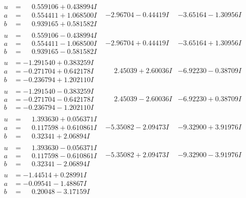 \documentclass[1p]{elsarticle_modified}
\theoremstyle{definition}
\begin{document}
$$\begin{array}{c|c|c}
\begin{aligned}
u &= \phantom{-}0.559106 + 0.438994 I \\
a &= \phantom{-}0.554411 + 1.068500 I \\
b &= \phantom{-}0.939165 + 0.581582 I\end{aligned}
 & -2.96704 - 0.44419 I & -3.65164 - 1.30956 I \\ \hline\begin{aligned}
u &= \phantom{-}0.559106 - 0.438994 I \\
a &= \phantom{-}0.554411 - 1.068500 I \\
b &= \phantom{-}0.939165 - 0.581582 I\end{aligned}
 & -2.96704 + 0.44419 I & -3.65164 + 1.30956 I \\ \hline\begin{aligned}
u &= -1.291540 + 0.383259 I \\
a &= -0.271704 + 0.642178 I \\
b &= -0.236794 + 1.202110 I\end{aligned}
 & \phantom{-}2.45039 + 2.60036 I & -6.92230 - 0.38709 I \\ \hline\begin{aligned}
u &= -1.291540 - 0.383259 I \\
a &= -0.271704 - 0.642178 I \\
b &= -0.236794 - 1.202110 I\end{aligned}
 & \phantom{-}2.45039 - 2.60036 I & -6.92230 + 0.38709 I \\ \hline\begin{aligned}
u &= \phantom{-}1.393630 + 0.056371 I \\
a &= \phantom{-}0.117598 + 0.610861 I \\
b &= \phantom{-}0.32341 + 2.06894 I\end{aligned}
 & -5.35082 - 2.09473 I & -9.32900 + 3.91976 I \\ \hline\begin{aligned}
u &= \phantom{-}1.393630 - 0.056371 I \\
a &= \phantom{-}0.117598 - 0.610861 I \\
b &= \phantom{-}0.32341 - 2.06894 I\end{aligned}
 & -5.35082 + 2.09473 I & -9.32900 - 3.91976 I \\ \hline\begin{aligned}
u &= -1.44514 + 0.28991 I \\
a &= -0.09541 - 1.48867 I \\
b &= \phantom{-}0.20048 - 3.17159 I\end{aligned}

\end{array}$$
\end{document}

